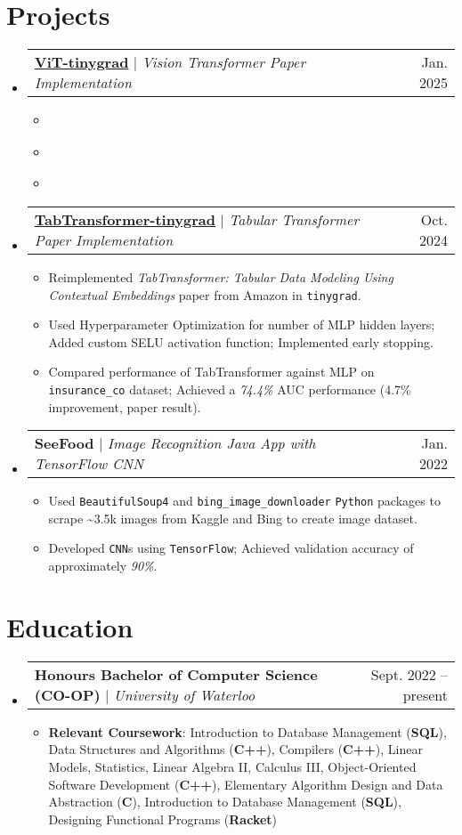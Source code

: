 \documentclass[letterpaper,11pt]{article}
\makeatletter
\newcommand{\resumeItem}[1]{
  \item\small{
    {#1 \vspace{-2pt}}
  }
}
\newcommand{\resumeProjectHeading}[2]{
    \item
    \begin{tabular*}{0.97\textwidth}{l@{\extracolsep{\fill}}r}
      \small#1 & #2 \\
    \end{tabular*}\vspace{-7pt}
}
\newcommand{\resumeSubHeadingListStart}{\begin{itemize}[leftmargin=0.15in, label={}]}
\newcommand{\resumeSubHeadingListEnd}{\end{itemize}}
\newcommand{\resumeItemListStart}{\begin{itemize}}
\newcommand{\resumeItemListEnd}{\end{itemize}\vspace{-5pt}}
\makeatother
\begin{document}
\section{Projects}
    \resumeSubHeadingListStart
        \resumeProjectHeading
        {\href{https://github.com/DarkHawk727/ViT-tinygrad}{\textbf{ViT-tinygrad}} $|$ \emph{Vision Transformer Paper Implementation}}{Jan. 2025}
        \resumeItemListStart
              \resumeItem {}
              \resumeItem {}
              \resumeItem {}
        \resumeItemListEnd
        \resumeProjectHeading
          {\href{https://github.com/DarkHawk727/TabTransformer-tinygrad}{\textbf{TabTransformer-tinygrad}} $|$ \emph{Tabular Transformer Paper Implementation}}{Oct. 2024}
          \resumeItemListStart
                \resumeItem {Reimplemented \emph{TabTransformer: Tabular Data Modeling Using Contextual Embeddings} paper from Amazon in \texttt{tinygrad}.}
                \resumeItem {Used Hyperparameter Optimization for number of MLP hidden layers; Added custom SELU activation function; Implemented early stopping.}
                \resumeItem {Compared performance of TabTransformer against MLP on \texttt{insurance\_co} dataset; Achieved a \emph{74.4\%} AUC performance (4.7\% improvement, paper result).}
          \resumeItemListEnd

        \resumeProjectHeading
          {\textbf{SeeFood} $|$ \emph{ Image Recognition Java App with TensorFlow CNN}}{Jan. 2022}
          \resumeItemListStart
                \resumeItem {Used \texttt{BeautifulSoup4} and \texttt{bing\_image\_downloader} \texttt{Python} packages to scrape \textasciitilde3.5k images from Kaggle and Bing to create image dataset.}
                \resumeItem {Developed \texttt{CNN}s using \texttt{TensorFlow}; Achieved validation accuracy of approximately \emph{90\%}.}
        \resumeItemListEnd
    \resumeSubHeadingListEnd


\section{Education}
  \resumeSubHeadingListStart
    \resumeProjectHeading
      {\textbf{Honours Bachelor of Computer Science (CO-OP)} $|$ \emph{University of Waterloo}}{Sept. 2022 -- present}
      \resumeItemListStart
      \resumeItem{\textbf{Relevant Coursework}: Introduction to Database Management (\textbf{SQL}), Data Structures and Algorithms (\textbf{C++}), Compilers (\textbf{C++}), Linear Models, Statistics, Linear Algebra II, Calculus III, Object-Oriented Software Development (\textbf{C++}), Elementary Algorithm Design and Data Abstraction (\textbf{C}), Introduction to Database Management (\textbf{SQL}), Designing Functional Programs (\textbf{Racket})}
      \resumeItemListEnd
  \resumeSubHeadingListEnd
\end{document}
